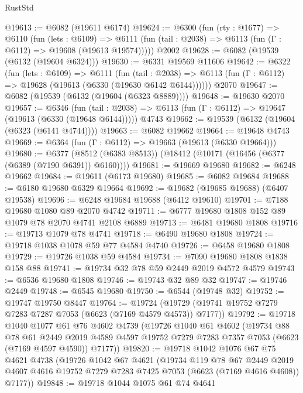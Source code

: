 \begin{lexlean}{RustStd}
\begin{coremodule}
@19613 := @6082 (@19611 @6174)
@19624 := @6300
    (fun (rty : @1677) =>
    @6110
      (fun (lets : @6109) =>
      @6111 (fun (tail : @2038) => @6113 (fun (Γ : @6112) => @19608 (@19613 @19574)))))
    @2002
@19628 := @6082 (@19539 (@6132 (@19604 @6324)))
@19630 := @6331 @19569 @11606
@19642 := @6322
    (fun (lets : @6109) =>
    @6111
      (fun (tail : @2038) =>
      @6113 (fun (Γ : @6112) => @19628 (@19613 (@6330 (@19630 @6142 @6144))))))
    @2070
@19647 := @6082 (@19539 (@6132 (@19604 (@6323 @8889))))
@19648 := @19630 @2070
@19657 := @6346
    (fun (tail : @2038) => @6113 (fun (Γ : @6112) => @19647 (@19613 (@6330 (@19648 @6144)))))
    @4743
@19662 := @19539 (@6132 (@19604 (@6323 (@6141 @4744))))
@19663 := @6082 @19662
@19664 := @19648 @4743
@19669 := @6364 (fun (Γ : @6112) => @19663 (@19613 (@6330 @19664)))
@19680 := @6377 (@8512 (@6383 @8513)) (@18412 (@10171 (@16456 (@6377 (@6389 (@7190 @6391)) @6160))))
@19681 := @19669 @19680
@19682 := @6248 @19662
@19684 := @19611 (@6173 @19680)
@19685 := @6082 @19684
@19688 := @6180 @19680 @6329 @19664
@19692 := @19682 (@19685 @19688) (@6407 @19538)
@19696 := @6248 @19684 @19688 (@6412 @19610)
@19701 := @7188 @19680 @1080 @89 @2070 @4742
@19711 := @6777 @19680 @1808 @152 @89 @1079 @78 @2070 @4741 @2108 @6889
@19713 := @6481 @19680 @1808
@19716 := @19713 @1079 @78 @4741
@19718 := @6490 @19680 @1808
@19724 := @19718 @1038 @1078 @59 @77 @4584 @4740
@19726 := @6458 @19680 @1808
@19729 := @19726 @1038 @59 @4584
@19734 := @7090 @19680 @1808 @1838 @158 @88
@19741 := @19734 @32 @78 @59 @2449 @2019 @4572 @4579
@19743 := @6536 @19680 @1808
@19746 := @19743 @32 @89 @32
@19747 := @19746 @2449
@19748 := @6545 @19680
@19750 := @6544 (@19748 @32)
@19752 := @19747 @19750 @8447
@19764 := @19724 (@19729 (@19741 @19752 @7279 @7283 @7287 @7053 (@6623 (@7169 @4579 @4573)) @7177))
@19792 := @19718
    @1040
    @1077
    @61
    @76
    @4602
    @4739
    (@19726
      @1040
      @61
      @4602
      (@19734
        @88
        @78
        @61
        @2449
        @2019
        @4589
        @4597
        @19752
        @7279
        @7283
        @7357
        @7053
        (@6623 (@7169 @4597 @4590))
        @7177))
@19820 := @19718
    @1042
    @1076
    @67
    @75
    @4621
    @4738
    (@19726
      @1042
      @67
      @4621
      (@19734
        @119
        @78
        @67
        @2449
        @2019
        @4607
        @4616
        @19752
        @7279
        @7283
        @7425
        @7053
        (@6623 (@7169 @4616 @4608))
        @7177))
@19848 := @19718
    @1044
    @1075
    @61
    @74
    @4641

\end{coremodule}
\end{lexlean}
